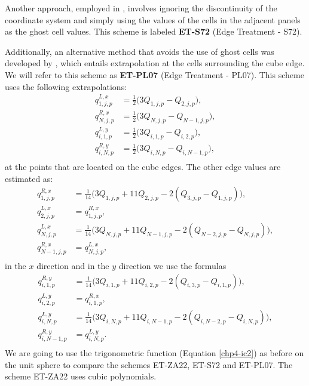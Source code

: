 Another approach, employed in \citet{sadourny:1972}, involves ignoring the
discontinuity of the coordinate system and simply using the values of the cells 
in the adjacent panels as the ghost cell values. This scheme is labeled \textbf{ET-S72} (Edge Treatment - S72).

Additionally, an alternative method that avoids the use of ghost cells was developed by
\citet{putman:2007}, which entails extrapolation at the cells surrounding the cube edge.
We will refer to this scheme as \textbf{ET-PL07} (Edge Treatment - PL07).
This scheme uses the following extrapolations:
\begin{align*}
	q^{L,x}_{1,j,p} &= \frac{1}{2}\bigg(3Q_{1,j,p} - Q_{2,j,p}\bigg),\\
	q^{R,x}_{N,j,p} &= \frac{1}{2}\bigg(3Q_{N,j,p} - Q_{N-1,j,p}\bigg),\\
	q^{L,y}_{i,1,p} &= \frac{1}{2}\bigg(3Q_{i,1,p} - Q_{i,2,p}\bigg),\\
	q^{R,y}_{i,N,p} &= \frac{1}{2}\bigg(3Q_{i,N,p} - Q_{i,N-1,p}\bigg),\\
\end{align*}
at the points that are located on the cube edges. The other edge values are estimated as:
\begin{align*}
	q^{R,x}_{1,j,p} &= \frac{1}{14}\bigg(3Q_{1,j,p} + 11Q_{2,j,p} - 2(Q_{3,j,p} - Q_{1,j,p})\bigg),\\
	q^{L,x}_{2,j,p} &= q^{R,x}_{1,j,p},\\
	q^{L,x}_{N,j,p} &= \frac{1}{14}\bigg(3Q_{N,j,p} + 11Q_{N-1,j,p} - 2(Q_{N-2,j,p} - Q_{N,j,p})\bigg),\\
	q^{R,x}_{N-1,j,p} &= q^{L,x}_{N,j,p},\\
\end{align*}
in the $x$ direction and in the $y$ direction we use the formulas
\begin{align*}
	q^{R,y}_{i,1,p} &= \frac{1}{14}\bigg(3Q_{i,1,p} + 11Q_{i,2,p} - 2(Q_{i,3,p} - Q_{i,1,p})\bigg),\\
	q^{L,y}_{i,2,p} &= q^{R,x}_{i,1,p},\\
	q^{L,y}_{i,N,p} &= \frac{1}{14}\bigg(3Q_{i,N,p} + 11Q_{i,N-1,p} - 2(Q_{i,N-2,p} - Q_{i,N,p})\bigg),\\
	q^{R,y}_{i,N-1,p} &= q^{L,y}_{i,N,p}.\\
\end{align*}
We are going to use the trigonometric function (Equation \eqref{chp4-ic2})
as before on the unit sphere to compare the schemes ET-ZA22, ET-S72 and ET-PL07. The scheme ET-ZA22 uses cubic polynomials.
